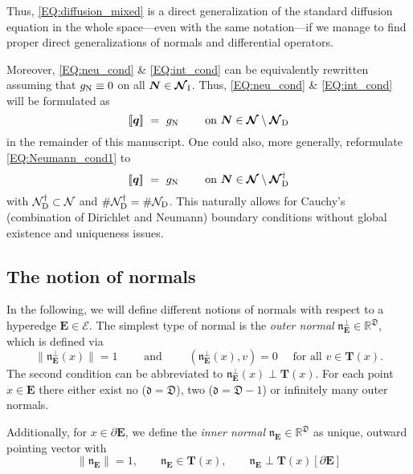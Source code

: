 \documentclass[a4paper, english, 12pt, reqno, draft]{amsart}
\theoremstyle{definition}
\theoremstyle{remark}
\numberwithin{equation}{section}
\newcommand{\setNode}{\ensuremath{\mathcal N}}
\newcommand{\setNodeDir}{\ensuremath{\setNode_\textup D}}
\newcommand{\SetEdge}{\ensuremath{\boldsymbol{\mathcal E}}}
\newcommand{\SetNode}{\ensuremath{\boldsymbol{\mathcal N}}}
\newcommand{\SetNodeDir}{\ensuremath{\SetNode_\textup D}}
\newcommand{\SetNodeInt}{\ensuremath{\SetNode_\textup I}}
\newcommand{\Edge}{{\ensuremath{\boldsymbol E}}}
\newcommand{\Node}{{\ensuremath{\boldsymbol N}}}
\newcommand{\locDim}{\ensuremath{\mathfrak d}}
\newcommand{\globDim}{\ensuremath{\mathfrak D}}
\newcommand{\tangent}{\ensuremath{{\boldsymbol T}}}
\newcommand{\Normal}{\ensuremath{\mathfrak n_\Edge}}
\newcommand{\NormalOuter}{\ensuremath{\mathfrak n^\perp_\Edge}}
\newcommand{\jump}[1]{{[\![ #1 ]\!]}}
\newcommand{\IR}{\ensuremath{\mathbb R}}
\renewcommand{\vec}[1]{\ensuremath{\boldsymbol{#1}}}
\begin{document}
% 
Thus, \eqref{EQ:diffusion_mixed} is a direct generalization of the standard diffusion equation in the whole space---even with the same notation---if we manage to find proper direct generalizations of normals and differential operators.

Moreover, \eqref{EQ:neu_cond} \& \eqref{EQ:int_cond} can be equivalently rewritten assuming that $g_\text N \equiv 0$ on all $\Node \in \SetNodeInt$. Thus, \eqref{EQ:neu_cond} \& \eqref{EQ:int_cond} will be formulated as
% 
\begin{equation}\label{EQ:Neumann_cond1}
 \jump{\vec q} ~=~ g_\textup N \qquad \text{ on } \Node \in \SetNode \setminus \SetNodeDir
\end{equation}
% 
in the remainder of this manuscript. One could also, more generally, reformulate \eqref{EQ:Neumann_cond1} to
% 
\begin{equation}
 \jump{\vec q} ~=~ g_\textup N \qquad \text{ on } \Node \in \SetNode \setminus \SetNodeDir^\dagger
\end{equation}
% 
with $\setNodeDir^\dagger \subset \setNode$ and $\# \setNodeDir^\dagger = \# \setNodeDir$. This naturally allows for Cauchy's (combination of Dirichlet and Neumann) boundary conditions without global existence and uniqueness issues. 
% 
\subsection{The notion of normals}\label{SEC:normals}
% 
In the following, we will define different notions of normals with respect to a hyperedge $\Edge \in \SetEdge$. The simplest type of normal is the \emph{outer normal} $\NormalOuter \in \IR^\globDim$, which is defined via
% 
\begin{equation*}
 \|\NormalOuter(x)\| = 1 \qquad \text{ and } \qquad (\NormalOuter(x), v) = 0 \quad \text{ for all } v \in \tangent(x).
\end{equation*}
% 
The second condition can be abbreviated to $\NormalOuter(x) \perp \tangent(x)$. For each point $x \in \Edge$ there either exist no ($\locDim = \globDim$), two ($\locDim = \globDim - 1$) or infinitely many outer normals.

Additionally, for $x \in \partial \Edge$, we define the \emph{inner normal} $\Normal \in \IR^\globDim$ as unique, outward pointing vector with
%
\begin{equation}\label{EQ:inner_const}
 \| \Normal \| = 1, \qquad \Normal \in \tangent(x), \qquad \Normal \perp \tangent(x) [\partial \Edge]
\end{equation}
\end{document}
